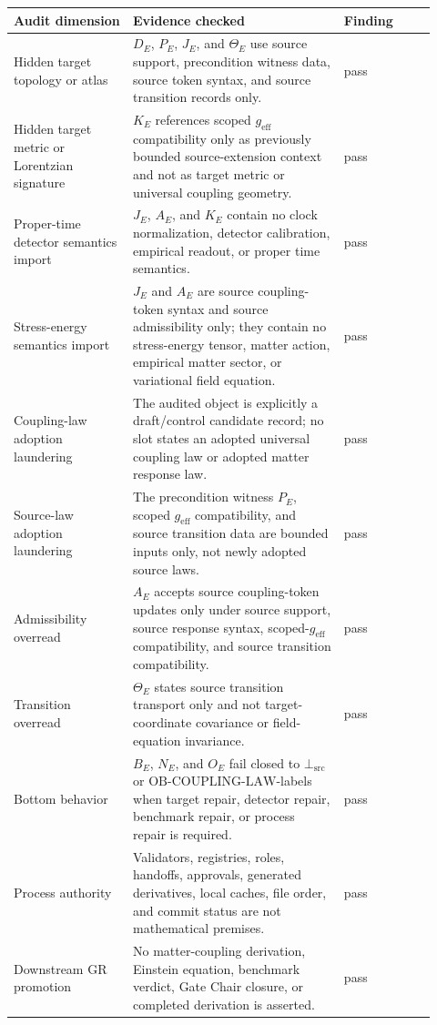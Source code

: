 \documentclass[11pt]{article}
\newcommand{\geff}{g_{\mathrm{eff}}}
\newcommand{\BottomSrc}{\bot_{\mathrm{src}}}
\newcommand{\OBLAW}{\mathrm{OB}\mbox{-}\mathrm{COUPLING}\mbox{-}\mathrm{LAW}}
\begin{document}
\begin{longtable}{p{0.26\linewidth}p{0.46\linewidth}p{0.20\linewidth}}
\toprule
Audit dimension & Evidence checked & Finding \\
\midrule
Hidden target topology or atlas & \(D_E\), \(P_E\), \(J_E\), and
\(\Theta_E\) use source support, precondition witness data, source token
syntax, and source transition records only. & pass \\
Hidden target metric or Lorentzian signature & \(K_E\) references scoped
\(\geff\) compatibility only as previously bounded source-extension context
and not as target metric or universal coupling geometry. & pass \\
Proper-time detector semantics import & \(J_E\), \(A_E\), and \(K_E\) contain
no clock normalization, detector calibration, empirical readout, or proper
time semantics. & pass \\
Stress-energy semantics import & \(J_E\) and \(A_E\) are source
coupling-token syntax and source admissibility only; they contain no
stress-energy tensor, matter action, empirical matter sector, or variational
field equation. & pass \\
Coupling-law adoption laundering & The audited object is explicitly a
draft/control candidate record; no slot states an adopted universal coupling
law or adopted matter response law. & pass \\
Source-law adoption laundering & The precondition witness \(P_E\), scoped
\(\geff\) compatibility, and source transition data are bounded inputs only,
not newly adopted source laws. & pass \\
Admissibility overread & \(A_E\) accepts source coupling-token updates only
under source support, source response syntax, scoped-\(\geff\) compatibility,
and source transition compatibility. & pass \\
Transition overread & \(\Theta_E\) states source transition transport only
and not target-coordinate covariance or field-equation invariance. & pass \\
Bottom behavior & \(B_E\), \(N_E\), and \(O_E\) fail closed to \(\BottomSrc\)
or \(\OBLAW\)-labels when target repair, detector repair, benchmark repair,
or process repair is required. & pass \\
Process authority & Validators, registries, roles, handoffs, approvals,
generated derivatives, local caches, file order, and commit status are not
mathematical premises. & pass \\
Downstream GR promotion & No matter-coupling derivation, Einstein equation,
benchmark verdict, Gate Chair closure, or completed derivation is asserted.
& pass \\
\bottomrule
\end{longtable}
\end{document}
